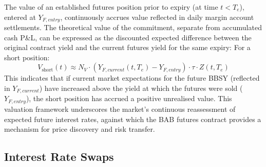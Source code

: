 \documentclass[11pt, a4paper, british]{article}
\begin{document}
The value of an established futures position prior to expiry (at time $t < T_e$), entered at $Y_{F, entry}$, continuously accrues value reflected in daily margin account settlements. The theoretical value of the commitment, separate from accumulated cash P\&L, can be expressed as the discounted expected difference between the original contract yield and the current futures yield for the same expiry:
For a short position:
\begin{equation} \label{eq:futures_valuation_t}
 V_{\text{short}}(t) \approx N_V \cdot (Y_{F,current}(t,T_e) - Y_{F,entry}) \cdot \tau \cdot Z(t, T_e)
\end{equation}
This indicates that if current market expectations for the future BBSY (reflected in $Y_{F, current}$) have increased above the yield at which the futures were sold ($Y_{F, entry}$), the short position has accrued a positive unrealised value. This valuation framework underscores the market's continuous reassessment of expected future interest rates, against which the BAB futures contract provides a mechanism for price discovery and risk transfer.
\newpage

\subsection{Interest Rate Swaps}
\end{document}
